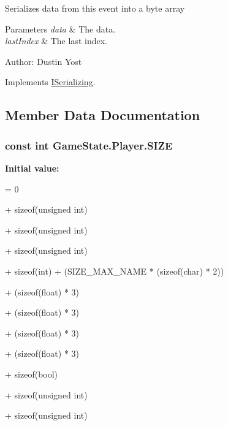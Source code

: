 Serializes data from this event into a byte array 


\begin{DoxyParams}{Parameters}
{\em data} & The data.\\
\hline
{\em last\-Index} & The last index.\\
\hline
\end{DoxyParams}


Author\-: Dustin Yost 

Implements \hyperlink{interface_i_serializing_ac31a44c2358a197e774fa3f79cc80356}{I\-Serializing}.



\subsection{Member Data Documentation}
\hypertarget{struct_game_state_1_1_player_a07b452f69128e1f3f6d3bb575c2976f1}{
\subsubsection[{S\-I\-Z\-E}]{\setlength{\rightskip}{0pt plus 5cm}const int Game\-State.\-Player.\-S\-I\-Z\-E\hspace{0.3cm}{\ttfamily [static]}}}\label{struct_game_state_1_1_player_a07b452f69128e1f3f6d3bb575c2976f1}
{\bfseries Initial value\-:}
\begin{DoxyCode}
= 0
            
            + \textcolor{keyword}{sizeof}(\textcolor{keywordtype}{unsigned} int)
            
            + \textcolor{keyword}{sizeof}(\textcolor{keywordtype}{unsigned} \textcolor{keywordtype}{int})
            
            + \textcolor{keyword}{sizeof}(\textcolor{keywordtype}{unsigned} int)
            
            + \textcolor{keyword}{sizeof}(\textcolor{keywordtype}{int}) + (SIZE\_MAX\_NAME * (\textcolor{keyword}{sizeof}(char) * 2))
            
            + (\textcolor{keyword}{sizeof}(\textcolor{keywordtype}{float}) * 3)
            
            + (\textcolor{keyword}{sizeof}(\textcolor{keywordtype}{float}) * 3)
            
            + (\textcolor{keyword}{sizeof}(\textcolor{keywordtype}{float}) * 3)
            
            + (\textcolor{keyword}{sizeof}(\textcolor{keywordtype}{float}) * 3)
            
            + \textcolor{keyword}{sizeof}(\textcolor{keywordtype}{bool})
            
            + \textcolor{keyword}{sizeof}(\textcolor{keywordtype}{unsigned} int)
            
            + \textcolor{keyword}{sizeof}(\textcolor{keywordtype}{unsigned} \textcolor{keywordtype}{int})
\end{DoxyCode}
